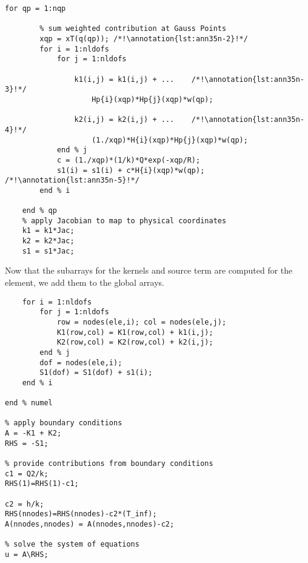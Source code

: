 \begin{lstlisting}[style=myMatlab,name=lec35n-ex]
    for qp = 1:nqp
        
        % sum weighted contribution at Gauss Points
        xqp = xT(q(qp)); /*!\annotation{lst:ann35n-2}!*/
        for i = 1:nldofs
            for j = 1:nldofs
                
                k1(i,j) = k1(i,j) + ...    /*!\annotation{lst:ann35n-3}!*/
                    Hp{i}(xqp)*Hp{j}(xqp)*w(qp);
                                
                k2(i,j) = k2(i,j) + ...    /*!\annotation{lst:ann35n-4}!*/
                    (1./xqp)*H{i}(xqp)*Hp{j}(xqp)*w(qp);
            end % j
            c = (1./xqp)*(1/k)*Q*exp(-xqp/R);
            s1(i) = s1(i) + c*H{i}(xqp)*w(qp);  /*!\annotation{lst:ann35n-5}!*/
        end % i
     
    end % qp
    % apply Jacobian to map to physical coordinates
    k1 = k1*Jac;
    k2 = k2*Jac;
    s1 = s1*Jac;

\end{lstlisting}
Now that the subarrays for the kernels and source term are computed for the element, we add them to the global arrays.

\begin{lstlisting}[style=myMatlab,name=lec35n-ex]
    % add local arrays to global arrays "assembly"
    for i = 1:nldofs
        for j = 1:nldofs
            row = nodes(ele,i); col = nodes(ele,j);
            K1(row,col) = K1(row,col) + k1(i,j);
            K2(row,col) = K2(row,col) + k2(i,j);
        end % j
        dof = nodes(ele,i);
        S1(dof) = S1(dof) + s1(i);
    end % i

end % numel

% apply boundary conditions
A = -K1 + K2;
RHS = -S1;

% provide contributions from boundary conditions
c1 = Q2/k;
RHS(1)=RHS(1)-c1;

c2 = h/k;
RHS(nnodes)=RHS(nnodes)-c2*(T_inf);
A(nnodes,nnodes) = A(nnodes,nnodes)-c2;

% solve the system of equations
u = A\RHS;
\end{lstlisting}



